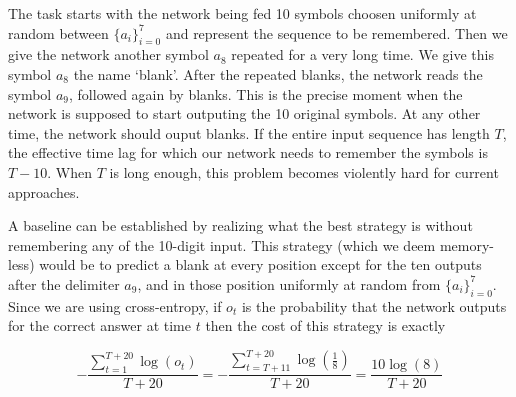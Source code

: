 \documentclass{article} %
\begin{document}
The task starts with the network being fed 10 symbols choosen uniformly at random between $\{a_i\}_{i=0}^7$ and represent the sequence to be remembered. Then we give the network another symbol $a_8$ repeated for a very long time. We give this symbol $a_8$ the name `blank'. After the repeated blanks, the network reads the symbol $a_9$, followed again by blanks. This is the precise moment when the network is supposed to start outputing the 10 original symbols. At any other time, the network should ouput blanks.
If the entire input sequence has length $T$, the effective time lag for which our network needs to remember the symbols is $T-10$. When $T$ is long enough, this problem becomes violently hard for current approaches.

A baseline can be established by realizing what the best strategy is without remembering any of the 10-digit input. This strategy (which we deem memory-less) would be to predict a blank at every position except for the ten outputs after the delimiter $a_9$, and in those position uniformly at random from $\{a_i\}_{i=0}^7$. Since we are using cross-entropy, if $o_t$ is the probability that the network outputs for the correct answer at time $t$ then the cost of this strategy is exactly

\begin{equation}
  -\frac{\sum_{t=1}^{T+20} \log (o_t)}{T+20} = - \frac{\sum_{t=T+11}^{T+20} \log \left( \frac{1}{8} \right)}{T+20} = \frac{10 \log(8)}{T+20} 
\end{equation}
\end{document}
